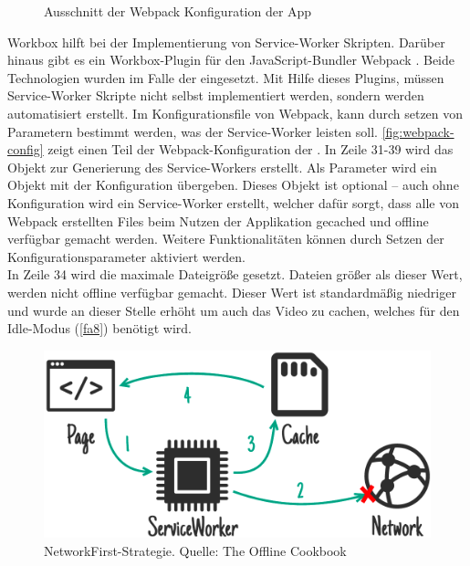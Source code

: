 \begin{figure}
  
  \caption{Ausschnitt der Webpack Konfiguration der \shst{} App}
  \label{fig:webpack-config}
\end{figure}

Workbox hilft bei der Implementierung von Service-Worker Skripten. Darüber hinaus gibt es ein 
Workbox-Plugin \cite{workbox-webpack-plugin} für den JavaScript-Bundler Webpack \cite{webpack}. 
Beide Technologien wurden im Falle der \shst{} eingesetzt. Mit Hilfe dieses Plugins, müssen 
Service-Worker Skripte nicht selbst implementiert werden, sondern werden automatisiert erstellt.
Im Konfigurationsfile von Webpack, kann durch setzen von Parametern bestimmt werden, was
der Service-Worker leisten soll. \autoref{fig:webpack-config} zeigt einen Teil der 
Webpack-Konfiguration der \shst{}. In Zeile 31-39 wird das Objekt zur Generierung des
Service-Workers erstellt. Als Parameter wird ein Objekt mit der Konfiguration übergeben. 
Dieses Objekt ist optional -- auch ohne Konfiguration wird ein Service-Worker erstellt,
welcher dafür sorgt, dass alle von Webpack erstellten Files beim Nutzen der Applikation
gecached und offline verfügbar gemacht werden. Weitere Funktionalitäten können durch
Setzen der Konfigurationsparameter aktiviert werden.\\
In Zeile 34 wird die maximale Dateigröße gesetzt. 
Dateien größer als dieser Wert, werden nicht offline verfügbar gemacht. Dieser Wert
ist standardmäßig niedriger und wurde an dieser Stelle erhöht um auch das Video zu cachen, welches
für den Idle-Modus (\ref{fa8}) benötigt wird.

\begin{figure}
    \centering
    \includegraphics[width=1\textwidth]{figures/images/ss-network-falling-back-to-cache.png}
    \caption{NetworkFirst-Strategie. Quelle: The Offline Cookbook \cite{offline-cookbook}}
    \label{fig:network-first}
\end{figure}

